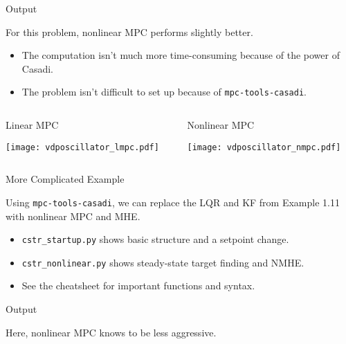 \documentclass[xcolor=dvipsnames]{beamer}
\begin{document}
\begin{frame}{Output}

For this problem, nonlinear MPC performs slightly better.
\begin{itemize}
    \item The computation isn't much more time-consuming because of the power of Casadi.
    \item The problem isn't difficult to set up because of \texttt{mpc-tools-casadi}.
\end{itemize}
    
\begin{columns}
    \begin{column}{.475\textwidth}
        \begin{block}{Linear MPC}
            \begin{center}
                \texttt{[image: vdposcillator\_lmpc.pdf]}
            \end{center}
        \end{block}
    \end{column}
    \begin{column}{.475\textwidth}
        \begin{block}{Nonlinear MPC}
            \begin{center}
                \texttt{[image: vdposcillator\_nmpc.pdf]}
            \end{center}
        \end{block}
    \end{column}
\end{columns}
\end{frame}

\begin{frame}{More Complicated Example}

Using \texttt{mpc-tools-casadi}, we can replace the LQR and KF from Example 1.11 with nonlinear MPC and MHE.

\begin{itemize}
    \item \texttt{cstr\_startup.py} shows basic structure and a setpoint change.
    \item \texttt{cstr\_nonlinear.py} shows steady-state target finding and NMHE.
    \item See the cheatsheet for important functions and syntax.
\end{itemize}

\end{frame}

\begin{frame}{Output}
    
    Here, nonlinear MPC knows to be less aggressive.
    \begin{center}
        
     \end{center}
\end{frame}
\end{document}
